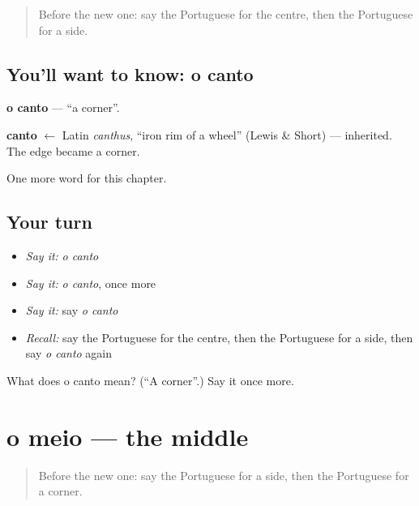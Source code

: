 \label{lesson:PT-C183-canto}



\begin{quote}
Before the new one: say the Portuguese for the centre, then the Portuguese for a side.
\end{quote}

\subsection*{You'll want to know: o canto}
\textbf{o canto} — \textquotedblleft{}a corner\textquotedblright{}.

\begin{cousinweb}
\textbf{canto} $\leftarrow$ Latin \emph{canthus}, \textquotedblleft{}iron rim of a wheel\textquotedblright{} (Lewis \& Short) — inherited. The edge became a corner.
\end{cousinweb}

\begin{grammarlens}[title={What you've built}]
One more word for this chapter.
\end{grammarlens}

\subsection*{Your turn}
\begin{itemize}
\raggedright
  \item \emph{Say it:} \emph{o canto}
  \item \emph{Say it:} \emph{o canto}, once more
  \item \emph{Say it:} say \emph{o canto}
  \item \emph{Recall:} say the Portuguese for the centre, then the Portuguese for a side, then say \emph{o canto} again
\end{itemize}

\begin{tcolorbox}[breakable,colback=teal!4,colframe=teal!35!black,title={Before you move on}]
What does o canto mean? (\textquotedblleft{}A corner\textquotedblright{}.) Say it once more.
\end{tcolorbox}
\section[o meio]{o meio — the middle}

\label{lesson:PT-C183-meio}



\begin{quote}
Before the new one: say the Portuguese for a side, then the Portuguese for a corner.
\end{quote}

